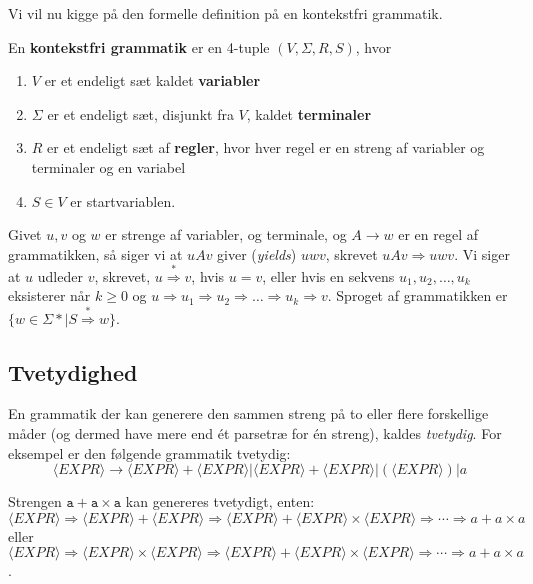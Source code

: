 Vi vil nu kigge på den formelle definition på en kontekstfri grammatik.

\begin{definition}
  En \textbf{kontekstfri grammatik}   er en 4-tuple $(V, \Sigma, R, S)$, hvor
  \begin{enumerate}
    \item $V$ er et endeligt sæt kaldet \textbf{variabler}
    \item $\Sigma$ er et endeligt sæt, disjunkt fra $V$, kaldet \textbf{terminaler}
    \item $R$ er et endeligt sæt af \textbf{regler}, hvor hver regel er en streng af variabler og terminaler og en variabel
    \item $S \in V$ er startvariablen.
  \end{enumerate}

\end{definition}

Givet $u, v$ og $w$ er strenge af variabler, og terminale, og $A \rightarrow w$ er en regel af grammatikken, så siger vi at $uAv$ giver (\textit{yields}) $uwv$, skrevet $uAv \Rightarrow uwv$. Vi siger at $u$ udleder $v$, skrevet, $u \stackrel{*}{\Rightarrow} v$, hvis $u = v$, eller hvis en sekvens $u_{1}, u_{2}, \ldots, u_{k}$ eksisterer når $k \geq 0$ og $u \Rightarrow u_{1} \Rightarrow u_{2} \Rightarrow \ldots \Rightarrow u_{k} \Rightarrow v$. Sproget af grammatikken er $\{w \in \Sigma* | S \stackrel{*}{\Rightarrow} w\}$.

\newpage
\subsection{Tvetydighed}%
\label{sub:tvetydighed}

En grammatik der kan generere den sammen streng på to eller flere forskellige måder (og dermed have mere end ét parsetræ for én streng), kaldes \textit{tvetydig}. For eksempel er den følgende grammatik tvetydig:
\[
\langle EXPR \rangle \rightarrow \langle EXPR \rangle + \langle EXPR \rangle | \langle EXPR \rangle + \langle EXPR \rangle | ( \langle EXPR \rangle ) | a
\]

Strengen $\mathtt{a + a \times a}$ kan genereres tvetydigt, enten: $$\langle EXPR \rangle \Rightarrow \langle EXPR \rangle + \langle EXPR \rangle \Rightarrow \langle EXPR \rangle + \langle EXPR \rangle \times \langle EXPR \rangle \Rightarrow \cdots \Rightarrow a + a \times a$$ eller $$\langle EXPR \rangle \Rightarrow \langle EXPR \rangle \times \langle EXPR \rangle \Rightarrow \langle EXPR \rangle + \langle EXPR \rangle \times \langle EXPR \rangle \Rightarrow \cdots \Rightarrow a + a \times a$$.

